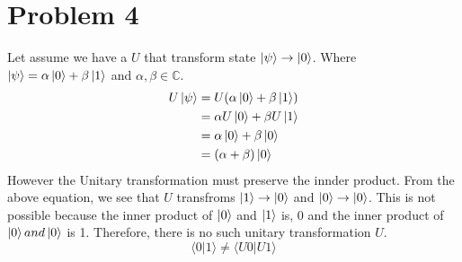 \documentclass[12pt]{article}
\begin{document}
\section*{Problem 4}
Let assume we have a \(U\) that transform state \(\ket{\psi} \rightarrow \ket{0}\). Where \(\ket{\psi} = \alpha \ket{0} + \beta \ket{1}\) and \(\alpha, \beta \in \mathbb{C}\).
\begin{align*}
	U\ket{\psi} & = U(\alpha \ket{0} + \beta \ket{1}) \\
	            & = \alpha U\ket{0} + \beta U\ket{1}  \\
	            & = \alpha \ket{0} + \beta \ket{0}    \\
	            & = (\alpha + \beta) \ket{0}
\end{align*}
However the Unitary transformation must preserve the innder product. From the above equation, we see that \(U\) transfroms \(\ket{1} \rightarrow \ket{0}\) and \(\ket{0} \rightarrow \ket{0}\).
This is not possible because the inner product of \(\ket{0}\) and \(\ket{1}\) is, 0 and the inner product of \(\ket{0} and \ket{0}\) is 1. Therefore, there is no such unitary transformation \(U\).
\[\langle 0|1\rangle \neq \langle U0 |U1\rangle   \]
\end{document}
